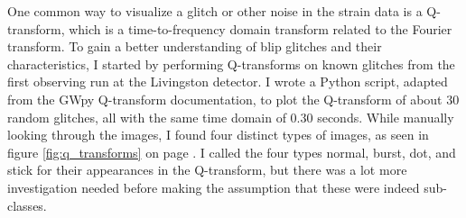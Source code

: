 \documentclass[a4paper]{article}
\begin{document}
One common way to visualize a glitch or other noise in the strain data is a Q-transform, which is a time-to-frequency domain transform related to the Fourier transform. To gain a better understanding of blip glitches and their characteristics, I started by performing Q-transforms on known glitches from the first observing run at the Livingston detector. I wrote a Python script, adapted from the GWpy Q-transform documentation, to plot the Q-transform of about 30 random glitches, all with the same time domain of 0.30 seconds. While manually looking through the images, I found four distinct types of images, as seen in figure \ref{fig:q_transforms} on page \pageref{fig:q_transforms}. I called the four types normal, burst, dot, and stick for their appearances in the Q-transform, but there was a lot more investigation needed before making the assumption that these were indeed sub-classes.
\end{document}
